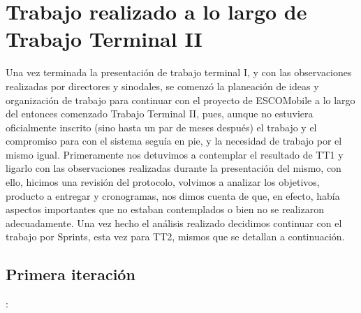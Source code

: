 \section{Trabajo realizado a lo largo de Trabajo Terminal II}

\noindent
Una vez terminada la presentación de trabajo terminal I, y con las observaciones realizadas por directores y sinodales, se comenzó la planeación de ideas y organización de trabajo para continuar con el proyecto de ESCOMobile a lo largo del entonces comenzado Trabajo Terminal II, pues, aunque no estuviera oficialmente inscrito (sino hasta un par de meses después) el trabajo y el compromiso para con el sistema seguía en pie, y la necesidad de trabajo por el mismo igual.  
\newline
Primeramente nos detuvimos a contemplar el resultado de TT1 y ligarlo con las observaciones realizadas durante la presentación del mismo, con ello, hicimos una revisión del protocolo, volvimos a analizar los objetivos, producto a entregar y cronogramas, nos dimos cuenta de que, en efecto, había aspectos importantes que no estaban contemplados o bien no se realizaron adecuadamente. Una vez hecho el análisis realizado decidimos continuar con el trabajo por Sprints, esta vez para TT2, mismos que se detallan a continuación. 
\newline

\subsection{Primera iteración}:

